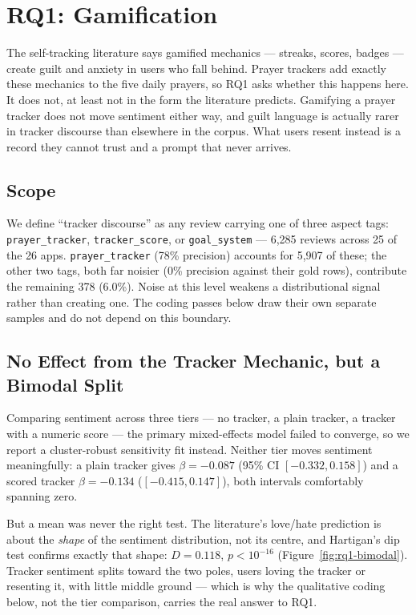 
\section{RQ1: Gamification}
\label{sec:rq1}

The self-tracking literature says gamified mechanics --- streaks, scores,
badges --- create guilt and anxiety in users who fall behind. Prayer trackers
add exactly these mechanics to the five daily prayers, so RQ1 asks whether this
happens here. It does not, at least not in the form the literature predicts.
Gamifying a prayer tracker does not move sentiment either way, and guilt
language is actually rarer in tracker discourse than elsewhere in the corpus.
What users resent instead is a record they cannot trust and a prompt that
never arrives.

\subsection{Scope}

We define ``tracker discourse'' as any review carrying one of three aspect
tags: \texttt{prayer\_tracker}, \texttt{tracker\_score}, or
\texttt{goal\_system} --- 6,285 reviews across 25 of the 26 apps.
\texttt{prayer\_tracker} (78\% precision) accounts for 5,907 of these; the
other two tags, both far noisier (0\% precision against their gold rows),
contribute the remaining 378 (6.0\%). Noise at this level weakens a
distributional signal rather than creating one. The coding passes below draw
their own separate samples and do not depend on this boundary.

\subsection{No Effect from the Tracker Mechanic, but a Bimodal Split}

Comparing sentiment across three tiers --- no tracker, a plain tracker, a
tracker with a numeric score --- the primary mixed-effects model failed to
converge, so we report a cluster-robust sensitivity fit instead. Neither tier
moves sentiment meaningfully: a plain tracker gives \(\beta=-0.087\) (95\% CI
\([-0.332, 0.158]\)) and a scored tracker \(\beta=-0.134\)
(\([-0.415, 0.147]\)), both intervals comfortably spanning zero.

But a mean was never the right test. The literature's love/hate prediction is
about the \emph{shape} of the sentiment distribution, not its centre, and
Hartigan's dip test confirms exactly that shape: \(D=0.118\), \(p<10^{-16}\)
(Figure~\ref{fig:rq1-bimodal}). Tracker sentiment splits toward the two poles,
users loving the tracker or resenting it, with little middle ground --- which
is why the qualitative coding below, not the tier comparison, carries the real
answer to RQ1.

